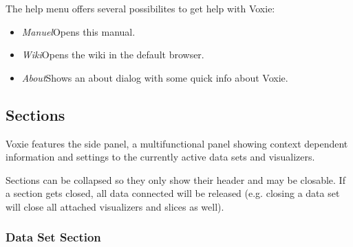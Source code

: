 The help menu offers several possibilites to get help with Voxie:

\begin{itemize}
  \item{\emph{Manuel}\newline Opens this manual.}
  \item{\emph{Wiki}\newline Opens the wiki in the default browser.}
  \item{\emph{About}\newline Shows an about dialog with some quick info about Voxie.}
\end{itemize}

\subsection{Sections}
\label{sections}

Voxie features the side panel, a multifunctional panel showing context dependent
information and settings to the currently active data sets and visualizers.

Sections can be collapsed so they only show their header and may be closable.
If a section gets closed, all data connected will be released (e.g. closing
a data set will close all attached visualizers and slices as well).


\subsubsection{Data Set Section}
